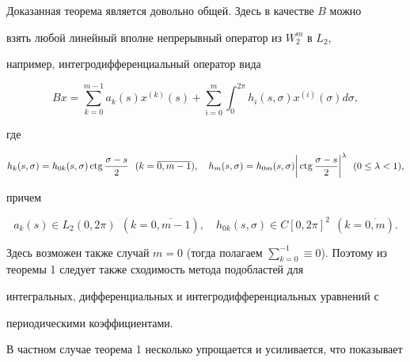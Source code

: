 \begin{note}


Доказанная теорема является довольно общей. Здесь в качестве $B$ можно 


взять любой линейный вполне непрерывный оператор из $W_2^m$ в $L_2$, 


например, интегродифференциальный оператор вида


\begin{equation}


Bx=\sum_{k=0}^{m-1} a_k(s) x^{(k)}(s) + \sum_{i=0}^{m} \int_{0}^{2 \pi} h_i


(s, \sigma) x^{(i)}( \sigma) d \sigma,


\tag{$1'$}


\end{equation}


где


$$


h_k(s,\sigma)=h_{0k}(s,\sigma)\ctg\frac{\sigma-s}{2}\ \ (k=\overline


{0,m-1}),\quad h_m(s, \sigma)=h_{0m}(s,\sigma) \bigg| \ctg \frac{\sigma-s}{2}


\bigg|^{\lambda}\ \ (0 \leq \lambda < 1),


$$


причем


$$


a_k(s) \in L_2(0,2 \pi) \ \ (k=\overline{0,m-1}),


\quad h_{0k}(s, \sigma) \in C[0,2\pi]^2\ \ (k=\overline{0,m}).


$$


Здесь возможен также случай $m=0$ (тогда полагаем $\sum\limits_{k=0}^{-1} \equiv


0$). Поэтому из теоремы 1 следует также сходимость метода подобластей для


интегральных, дифференциальных и интегродифференциальных уравнений с


периодическими коэффициентами.


\end{note}








В частном случае теорема 1 несколько упрощается и усиливается, что показывает








